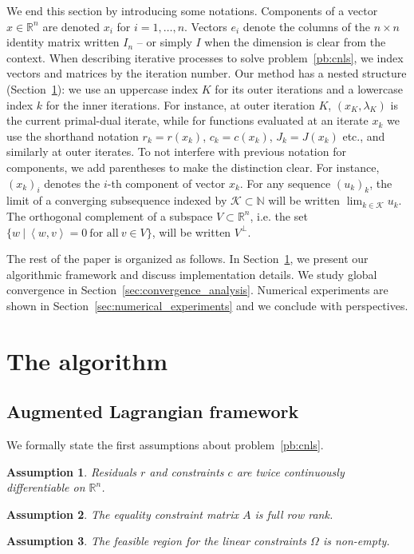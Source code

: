 \documentclass{article}
\numberwithin{equation}{section}
\newcommand{\RR}{{\mathbb{R}}} %
\newcommand{\NN}{{\mathbb{N}}} %
\newcommand{\calK}{{\mathcal{K}}}
\newcommand{\inner}[2]{\left\langle {#1} , {#2} \right\rangle} %
\theoremstyle{plain}
\newtheorem{assumption}{Assumption}
\begin{document}
	We end this section by introducing some notations. Components of a vector $x\in\RR^n$ are denoted $x_i$ for $i=1,\ldots,n$. Vectors $e_i$ denote the columns of the $n \times n$ identity matrix written $I_n$ -- or simply $I$ when the dimension is clear from the context. When describing iterative processes to solve problem~\eqref{pb:cnls}, we index vectors and matrices by the iteration number. Our method has a nested structure (Section~\ref{sec:algorithm}): we use an uppercase index $K$ for its outer iterations and a lowercase index $k$ for the inner iterations. For instance, at outer iteration $K$, $(x_K,\lambda_K)$ is the current primal-dual iterate, while for functions evaluated at an iterate $x_k$ we use the shorthand notation $r_k = r(x_k)$, $c_k =c(x_k)$, $J_k=J(x_k)$ etc., and similarly at outer iterates. To not interfere with previous notation for components, we add parentheses to make the distinction clear. For instance, $(x_k)_i$ denotes the $i$-th component of vector $x_k$. For any sequence $(u_k)_k$, the limit of a converging subsequence indexed by $\calK \subset \NN$ will be written $\lim_{k \in \calK} u_k$. The orthogonal complement of a subspace $V \subset \RR^n$, i.e. the set $\{ w\ | \ \inner{w}{v}=0\ \text{for all}\ v \in V\}$, will be written $V^\perp$.
	
	The rest of the paper is organized as follows. In Section~\ref{sec:algorithm}, we present our algorithmic framework and discuss implementation details. We study global convergence in Section~\ref{sec:convergence_analysis}. Numerical experiments are shown in Section~\ref{sec:numerical_experiments} and we conclude with perspectives.
	
	
	\section{The algorithm}\label{sec:algorithm}
	
	\subsection{Augmented Lagrangian framework}\label{subsec:al_framework}
	
	We formally state the first assumptions about problem~\eqref{pb:cnls}.
	\begin{assumption}\label{assumption:functions_C2}
		Residuals $r$ and constraints $c$ are twice continuously differentiable on $\RR^n$.
	\end{assumption}
	\begin{assumption}\label{assumption:full_rank_A}
		The equality constraint matrix $A$ is full row rank.
	\end{assumption}
	\begin{assumption}\label{assumption:feasible_linear_cons}
		The feasible region for the linear constraints $\Omega$ is non-empty.
	\end{assumption}
	
\end{document}
